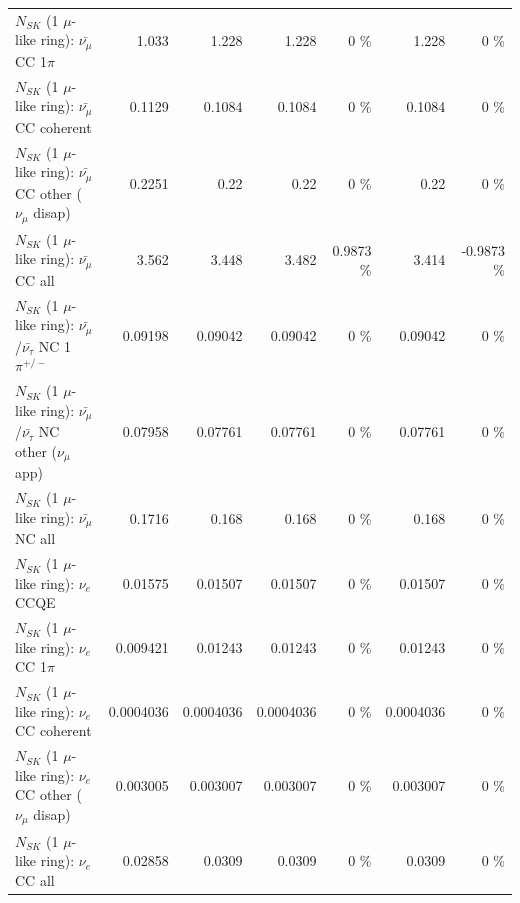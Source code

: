 \begin{table}
\begin{tabular}{| l | r | r | r  r | r  r |}
                         $N_{SK}$ (1 $\mu$-like ring): $\bar{\nu_\mu}$ CC 1$\pi$ &           1.033 &           1.228 &           1.228 &        0 \%  &           1.228 &        0 \%  \\ 
                       $N_{SK}$ (1 $\mu$-like ring): $\bar{\nu_\mu}$ CC coherent &          0.1129 &          0.1084 &          0.1084 &        0 \%  &          0.1084 &        0 \%  \\ 
        $N_{SK}$ (1 $\mu$-like ring): $\bar{\nu_\mu}$ CC other ($\nu_\mu$ disap) &          0.2251 &            0.22 &            0.22 &        0 \%  &            0.22 &        0 \%  \\ 
                          $N_{SK}$ (1 $\mu$-like ring): $\bar{\nu_{\mu}}$ CC all &           3.562 &           3.448 &           3.482 &   0.9873 \%  &           3.414 &  -0.9873 \%  \\ 
\hline
  $N_{SK}$ (1 $\mu$-like ring): $\bar{\nu_\mu}$/$\bar{\nu_\tau}$ NC 1$\pi^{+/-}$ &         0.09198 &         0.09042 &         0.09042 &        0 \%  &         0.09042 &        0 \%  \\ 
$N_{SK}$ (1 $\mu$-like ring): $\bar{\nu_\mu}$/$\bar{\nu_\tau}$ NC other ($\nu_\mu$ app) &         0.07958 &         0.07761 &         0.07761 &        0 \%  &         0.07761 &        0 \%  \\ 
                          $N_{SK}$ (1 $\mu$-like ring): $\bar{\nu_{\mu}}$ NC all &          0.1716 &           0.168 &           0.168 &        0 \%  &           0.168 &        0 \%  \\ 
\hline
\hline
\hline
                                      $N_{SK}$ (1 $\mu$-like ring): $\nu_e$ CCQE &         0.01575 &         0.01507 &         0.01507 &        0 \%  &         0.01507 &        0 \%  \\ 
                                 $N_{SK}$ (1 $\mu$-like ring): $\nu_e$ CC 1$\pi$ &        0.009421 &         0.01243 &         0.01243 &        0 \%  &         0.01243 &        0 \%  \\ 
                               $N_{SK}$ (1 $\mu$-like ring): $\nu_e$ CC coherent &       0.0004036 &       0.0004036 &       0.0004036 &        0 \%  &       0.0004036 &        0 \%  \\ 
                $N_{SK}$ (1 $\mu$-like ring): $\nu_e$ CC other ($\nu_\mu$ disap) &        0.003005 &        0.003007 &        0.003007 &        0 \%  &        0.003007 &        0 \%  \\ 
                                  $N_{SK}$ (1 $\mu$-like ring): $\nu_{e}$ CC all &         0.02858 &          0.0309 &          0.0309 &        0 \%  &          0.0309 &        0 \%  \\ 

\end{tabular}
\end{table}
